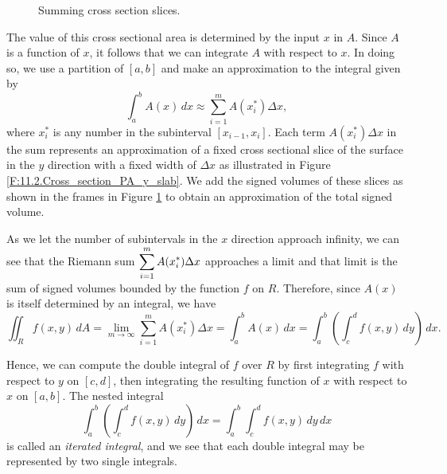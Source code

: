 \begin{figure}[ht]
\begin{center}
\end{center}
\caption{Summing cross section slices.}
\label{F:11.2.Cross_section_y_slab_sum}
\end{figure}

The value of this cross sectional area is determined by the input $x$ in $A$. Since $A$ is a function of $x$, it follows that  we can integrate $A$ with respect to $x$. In doing so, we use a partition of $[a, b]$ and make an approximation to the integral given by
\[\int_a^b A(x) \, dx  \approx \sum_{i=1}^m A(x_i^*) \Delta x,\]
where $x_i^*$ is any number in the subinterval $[x_{i-1},x_i]$. Each term $A(x_i^*) \Delta x$ in the sum represents an approximation of a fixed cross sectional slice of the surface in the $y$ direction with a fixed width of $\Delta x$ as illustrated in Figure \ref{F:11.2.Cross_section_PA_y_slab}. We add the signed volumes of these slices as shown in the frames in Figure \ref{F:11.2.Cross_section_y_slab_sum} to obtain an approximation of the total signed volume.

As we let the number of subintervals in the $x$ direction approach infinity, we can see that the Riemann sum $\displaystyle \sum_{i=1}^m A(x_i^*) \Delta x$
approaches a limit and that limit is the sum of signed volumes bounded by the function $f$ on $R$. Therefore, since $A(x)$ is itself determined by an integral, we have
\[\iint_R f(x,y) \, dA = \lim_{m \to \infty} \sum_{i=1}^m A(x_i^*) \Delta x = \int_a^b A(x) \, dx = \int_a^b \left( \int_c^d f(x,y) \, dy \right) \, dx.\]

Hence, we can compute the double integral of $f$ over $R$ by first integrating $f$ with respect to $y$ on $[c, d]$, then integrating the resulting function of $x$ with respect to $x$ on $[a, b]$. The nested integral
\[\int_a^b \left( \int_c^d f(x,y) \, dy \right) \, dx = \int_a^b \int_c^d f(x,y) \, dy \, dx \]
is called an \emph{iterated integral}, and we see that each double integral may be represented by two single integrals.

